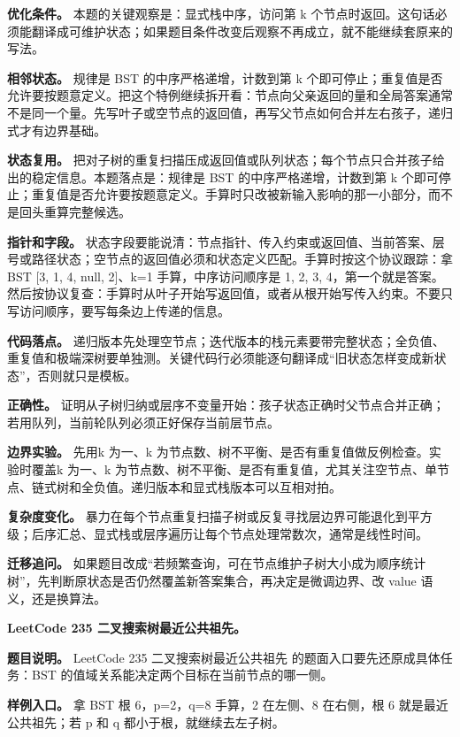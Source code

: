 \textbf{优化条件。} 本题的关键观察是：显式栈中序，访问第 k 个节点时返回。这句话必须能翻译成可维护状态；如果题目条件改变后观察不再成立，就不能继续套原来的写法。

\textbf{相邻状态。} 规律是 BST 的中序严格递增，计数到第 k 个即可停止；重复值是否允许要按题意定义。把这个特例继续拆开看：节点向父亲返回的量和全局答案通常不是同一个量。先写叶子或空节点的返回值，再写父节点如何合并左右孩子，递归式才有边界基础。

\textbf{状态复用。} 把对子树的重复扫描压成返回值或队列状态；每个节点只合并孩子给出的稳定信息。本题落点是：规律是 BST 的中序严格递增，计数到第 k 个即可停止；重复值是否允许要按题意定义。手算时只改被新输入影响的那一小部分，而不是回头重算完整候选。

\textbf{指针和字段。} 状态字段要能说清：节点指针、传入约束或返回值、当前答案、层号或路径状态；空节点的返回值必须和状态定义匹配。手算时按这个协议跟踪：拿 BST [3, 1, 4, null, 2]、k=1 手算，中序访问顺序是 1, 2, 3, 4，第一个就是答案。然后按协议复查：手算时从叶子开始写返回值，或者从根开始写传入约束。不要只写访问顺序，要写每条边上传递的信息。

\textbf{代码落点。} 递归版本先处理空节点；迭代版本的栈元素要带完整状态；全负值、重复值和极端深树要单独测。关键代码行必须能逐句翻译成“旧状态怎样变成新状态”，否则就只是模板。

\textbf{正确性。} 证明从子树归纳或层序不变量开始：孩子状态正确时父节点合并正确；若用队列，当前轮队列必须正好保存当前层节点。

\textbf{边界实验。} 先用k 为一、k 为节点数、树不平衡、是否有重复值做反例检查。实验时覆盖k 为一、k 为节点数、树不平衡、是否有重复值，尤其关注空节点、单节点、链式树和全负值。递归版本和显式栈版本可以互相对拍。

\textbf{复杂度变化。} 暴力在每个节点重复扫描子树或反复寻找层边界可能退化到平方级；后序汇总、显式栈或层序遍历让每个节点处理常数次，通常是线性时间。

\textbf{迁移追问。} 如果题目改成“若频繁查询，可在节点维护子树大小成为顺序统计树”，先判断原状态是否仍然覆盖新答案集合，再决定是微调边界、改 value 语义，还是换算法。

\noindent\textbf{LeetCode 235 二叉搜索树最近公共祖先。}

\textbf{题目说明。} LeetCode 235 二叉搜索树最近公共祖先 的题面入口要先还原成具体任务：BST 的值域关系能决定两个目标在当前节点的哪一侧。

\textbf{样例入口。} 拿 BST 根 6，p=2，q=8 手算，2 在左侧、8 在右侧，根 6 就是最近公共祖先；若 p 和 q 都小于根，就继续去左子树。

